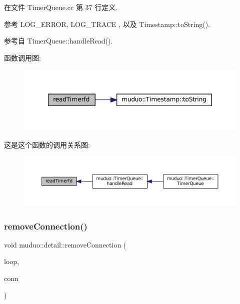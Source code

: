 在文件 Timer\+Queue.\+cc 第 37 行定义.



参考 L\+O\+G\+\_\+\+E\+R\+R\+OR, L\+O\+G\+\_\+\+T\+R\+A\+CE , 以及 Timestamp\+::to\+String().



参考自 Timer\+Queue\+::handle\+Read().

函数调用图\+:
\nopagebreak
\begin{figure}[H]
\begin{center}
\leavevmode
\includegraphics[width=349pt]{namespacemuduo_1_1detail_a08d79eafe298b7df1941adb4105bf75a_cgraph}
\end{center}
\end{figure}
这是这个函数的调用关系图\+:
\nopagebreak
\begin{figure}[H]
\begin{center}
\leavevmode
\includegraphics[width=350pt]{namespacemuduo_1_1detail_a08d79eafe298b7df1941adb4105bf75a_icgraph}
\end{center}
\end{figure}
\mbox{\label{namespacemuduo_1_1detail_ae3e6bfc20f665df13eeb2ebc3c91abce}} 
\subsubsection{\texorpdfstring{remove\+Connection()}{removeConnection()}}
{\footnotesize\ttfamily void muduo\+::detail\+::remove\+Connection (\begin{DoxyParamCaption}\item[{\hyperlink{classmuduo_1_1EventLoop}{Event\+Loop} $\ast$}]{loop,  }\item[{const \hyperlink{namespacemuduo_a40c45128e9700d337d92f3cbb8dd4a0a}{Tcp\+Connection\+Ptr} \&}]{conn }\end{DoxyParamCaption})}



